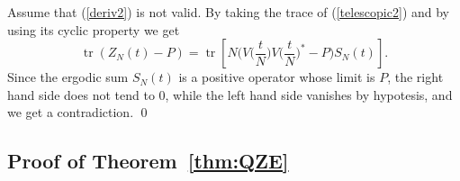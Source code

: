 \documentclass[aip,jmp,12pt
]{revtex4}
\newcommand{\tr}{\mathop{\mathrm{tr}}\nolimits}
\theoremstyle{definition}
\begin{document}
Assume that (\ref{deriv2}) is not valid. By taking the trace of (\ref{telescopic2}) and by using its cyclic property we get
\begin{equation*}
\tr(Z_N(t)-P )
=   \tr \left[ N\Big(
V\Big(\frac{t}{N}\Big) V\Big(\frac{t}{N}\Big)^* - P \Big) S_N(t) \right].
\end{equation*}
Since the ergodic sum $S_N(t)$ is a positive operator whose limit is $P$, the right hand side does not tend to 0, while the left hand side vanishes by hypotesis, and we get a contradiction.
\qed





\subsection*{Proof of Theorem~\ref{thm:QZE}}
\end{document}
